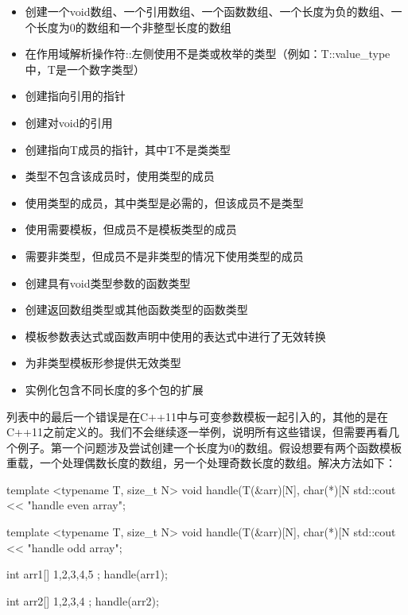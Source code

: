 \begin{itemize}
\item
创建一个void数组、一个引用数组、一个函数数组、一个长度为负的数组、一个长度为0的数组和一个非整型长度的数组

\item
在作用域解析操作符::左侧使用不是类或枚举的类型（例如：T::value\_type中，T是一个数字类型）

\item
创建指向引用的指针

\item
创建对void的引用

\item
创建指向T成员的指针，其中T不是类类型

\item
类型不包含该成员时，使用类型的成员

\item
使用类型的成员，其中类型是必需的，但该成员不是类型

\item
使用需要模板，但成员不是模板类型的成员

\item
需要非类型，但成员不是非类型的情况下使用类型的成员

\item
创建具有void类型参数的函数类型

\item
创建返回数组类型或其他函数类型的函数类型

\item
模板参数表达式或函数声明中使用的表达式中进行了无效转换

\item
为非类型模板形参提供无效类型

\item
实例化包含不同长度的多个包的扩展
\end{itemize}

列表中的最后一个错误是在C++11中与可变参数模板一起引入的，其他的是在C++11之前定义的。我们不会继续逐一举例，说明所有这些错误，但需要再看几个例子。第一个问题涉及尝试创建一个长度为0的数组。假设想要有两个函数模板重载，一个处理偶数长度的数组，另一个处理奇数长度的数组。解决方法如下：

\begin{cpp}
template <typename T, size_t N>
void handle(T(&arr)[N], char(*)[N %
{
	std::cout << "handle even array\n";
}

template <typename T, size_t N>
void handle(T(&arr)[N], char(*)[N %
{
	std::cout << "handle odd array\n";
}

int arr1[]{ 1,2,3,4,5 };
handle(arr1);

int arr2[]{ 1,2,3,4 };
handle(arr2);
\end{cpp}

